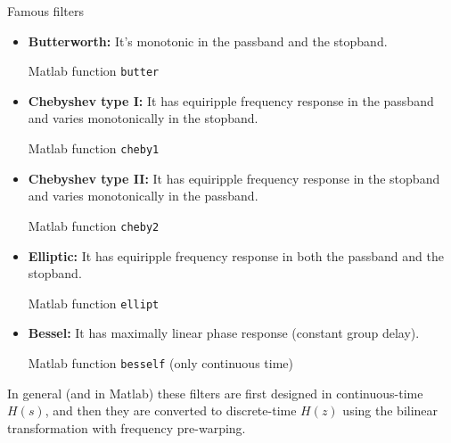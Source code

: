 \documentclass[10pt, handout]{beamer}
\begin{document}
\begin{frame}{Famous filters}
	\begin{itemize}
		\item \textbf{Butterworth:}
		It's monotonic in the passband and the stopband.
		
		Matlab function \texttt{butter}
		\item \textbf{Chebyshev type I:}
		It has equiripple frequency response in the passband and varies monotonically in the stopband.
		
		Matlab function \texttt{cheby1}
		\item \textbf{Chebyshev type II:}
		It has equiripple frequency response in the stopband and varies monotonically in the passband.
		
		Matlab function \texttt{cheby2}
		\item \textbf{Elliptic:}
		It has equiripple frequency response in both the passband and the stopband.
		
		Matlab function \texttt{ellipt}
		
		\item \textbf{Bessel:}
		It has maximally linear phase response (constant group delay).
		
		Matlab function \texttt{besself} (only continuous time)
	\end{itemize}

	In general (and in Matlab) these filters are first designed in continuous-time $H(s)$, and then they are converted to discrete-time $H(z)$ using the bilinear transformation with frequency pre-warping.
\end{frame}
\end{document}
